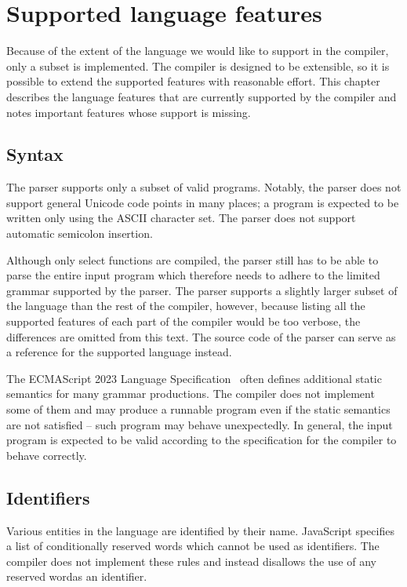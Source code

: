 \chapter{Supported language features}\label{chap:supported_lang}

Because of the extent of the language we would like to support in the compiler, only a subset is implemented. The compiler is designed to be extensible, so it is possible to extend the supported features with reasonable effort. This chapter describes the language features that are currently supported by the compiler and notes important features whose support is missing.


\section{Syntax}

The parser supports only a subset of valid programs. Notably, the parser does not support general Unicode code points in many places; a program is expected to be written only using the ASCII character set. The parser does not support automatic semicolon insertion.

Although only select functions are compiled, the parser still has to be able to parse the entire input program which therefore needs to adhere to the limited grammar supported by the parser. The parser supports a slightly larger subset of the language than the rest of the compiler, however, because listing all the supported features of each part of the compiler would be too verbose, the differences are omitted from this text. The source code of the parser can serve as a reference for the supported language instead.

The ECMAScript 2023 Language Specification~\cite{ecma262} often defines additional static semantics for many grammar productions. The compiler does not implement some of them and may produce a runnable program even if the static semantics are not satisfied -- such program may behave unexpectedly. In general, the input program is expected to be valid according to the specification for the compiler to behave correctly.


\section{Identifiers}

Various entities in the language are identified by their name. JavaScript specifies a list of conditionally reserved words which cannot be used as identifiers. The compiler does not implement these rules and instead disallows the use of any reserved word\footnotemark[1] as an identifier.


